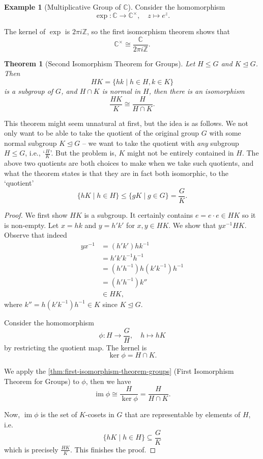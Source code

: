 \documentclass{article}
\newtheorem{theorem}{Theorem}[section]
\theoremstyle{definition}
\newtheorem*{example*}{Example}
\theoremstyle{remark}
\newcommand{\pqty}[1]{\left(#1\right)}
\newcommand{\set}[2]{\{#1\mid #2\}}
\newcommand{\flatfrac}[2]{\frac{#1}{#2}}
\newcommand{\function}[5]{#1:#2\to #3,\quad #4\mapsto #5}
\newcommand{\inverse}{^{-1}}
\newcommand{\multiplicative}{^{\times}}
\newcommand{\isomorphic}{\cong}
\newcommand{\normalsub}{\trianglelefteq}
\newcommand{\subgroup}{\leq}
\newcommand{\ZZ}{\mathbb{Z}}
\newcommand{\CC}{\mathbb{C}}
\newcommand{\img}{\operatorname{im}}
\begin{document}
\begin{example*}[Multiplicative Group of \(\CC\)]
    Consider the homomorphism
    \[
        \function{\exp}{\CC}{\CC\multiplicative}{z}{e^z.}
    \]
    
    The kernel of \(\exp\) is \(2\pi i \ZZ\), so the first isomorphism theorem shows that
    \[
        \CC\multiplicative \isomorphic \flatfrac{\CC}{2\pi i \ZZ}.
    \]
\end{example*}

\begin{theorem}[Second Isomorphism Theorem for Groups]
    \label{thm:second-isomorphism-theorem-groups}%
    Let \(H \subgroup G\) and \(K \normalsub G\). Then
    \[
        HK = \set{hk}{h \in H, k \in K}
    \]
    is a subgroup of \(G\), and \(H \cap K\) is normal in \(H\), then there is an isomorphism
    \[
        \flatfrac{HK}{K} \isomorphic \flatfrac{H}{H \cap K}.
    \]
\end{theorem}

This theorem might seem unnatural at first, but the idea is as follows. We not only want to be able to take the quotient of the original group \(G\) with some normal subgroup \(K \normalsub G\) -- we want to take the quotient with \emph{any} subgroup \(H \subgroup G\), i.e., `\(\flatfrac{H}{K}\)'. But the problem is, \(K\) might not be entirely contained in \(H\). The above two quotients are both choices to make when we take such quotients, and what the theorem states is that they are in fact both isomorphic, to the `quotient'
\[
    \set{hK}{h \in H} \subgroup \set{gK}{g \in G} = \flatfrac{G}{K}.
\]

\begin{proof}
    We first show \(HK\) is a subgroup. It certainly contains \(e = e \cdot e \in HK\) so it is non-empty. Let \(x = hk\) and \(y = h' k'\) for \(x, y \in HK\). We show that \(y x \inverse HK\). Observe that indeed
    \begin{align*}
        y x \inverse &= \pqty{h' k'}{h k}\inverse \\
        &= h' k' k \inverse h\inverse \\
        &= \pqty{h' h\inverse} h \pqty{k' k\inverse} h\inverse \\
        &= \pqty{h' h\inverse} k'' \\
        &\in HK,
    \end{align*}
    where \(k'' = h \pqty{k' k\inverse} h\inverse \in K\) since \(K \normalsub G\).

    Consider the homomorphism
    \[
        \function{\phi}{H}{\flatfrac{G}{H}}{h}{hK}
    \]
    by restricting the quotient map. The kernel is
    \[
        \ker \phi = H \cap K.
    \]

    We apply the \autoref{thm:first-isomorphism-theorem-groups} (First Isomorphism Theorem for Groups) to \(\phi\), then we have
    \[
        \img \phi \isomorphic \flatfrac{H}{\ker \phi} = \flatfrac{H}{H \cap K}.
    \]

    Now, \(\img \phi\) is the set of \(K\)-cosets in \(G\) that are representable by elements of \(H\), i.e.
    \[
        \set{hK}{h \in H} \subseteq \flatfrac{G}{K}
    \]
    which is precisely \(\flatfrac{HK}{K}\). This finishes the proof.
\end{proof}
\end{document}
